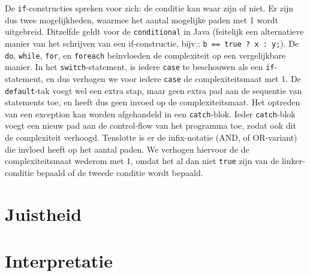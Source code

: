 \documentclass[a4paper]{article}
\begin{document}
De \texttt{if}-constructies spreken voor zich: de conditie kan waar zijn of niet. Er zijn dus twee mogelijkheden, waarmee het aantal mogelijke paden met 1 wordt uitgebreid. Ditzelfde geldt voor de \texttt{conditional} in Java (feitelijk een alternatieve manier van  het schrijven van een if-constructie, bijv.: \texttt{b == true ? x : y;}). De \texttt{do}, \texttt{while}, \texttt{for}, en \texttt{foreach} be\"invloeden de complexiteit op een vergelijkbare manier. In het \texttt{switch}-statement, is iedere \texttt{case} te beschouwen als een \texttt{if}-statement, en dus verhogen we voor iedere \texttt{case} de complexiteitsmaat met 1. 
De \texttt{default}-tak voegt wel een extra stap, maar geen extra pad aan de sequentie van statements toe, en heeft dus geen invoed op de complexiteitsmaat.
Het optreden van een exception kan worden afgehandeld in een \texttt{catch}-blok. Ieder \texttt{catch}-blok voegt een nieuw pad aan de control-flow van het programma toe, zodat ook dit de complexiteit verhoogd.
Tenslotte is er de infix-notatie (AND, of OR-variant) die invloed heeft op het aantal paden. We verhogen hiervoor de de complexiteitsmaat wederom met 1, omdat het al dan niet \texttt{true} zijn van de linker-conditie bepaald of de tweede conditie wordt bepaald.


\section{Juistheid}

\section{Interpretatie}
\end{document}
